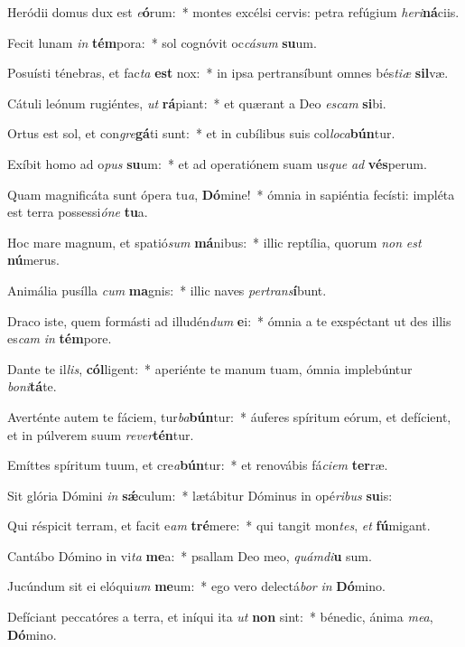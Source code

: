 \item Heródii domus dux est \textit{e}\textbf{ó}rum:~* montes excélsi cervis: petra refúgium \textit{he}\textit{ri}\textbf{ná}ciis.
\item Fecit lunam \textit{in} \textbf{tém}pora:~* sol cognóvit oc\textit{cá}\textit{sum} \textbf{su}um.
\item Posuísti ténebras, et fac\textit{ta} \textbf{est} nox:~* in ipsa pertransíbunt omnes bés\textit{ti}\textit{æ} \textbf{sil}væ.
\item Cátuli leónum rugiéntes, \textit{ut} \textbf{rá}piant:~* et quærant a Deo \textit{es}\textit{cam} \textbf{si}bi.
\item Ortus est sol, et con\textit{gre}\textbf{gá}ti sunt:~* et in cubílibus suis col\textit{lo}\textit{ca}\textbf{bún}tur.
\item Exíbit homo ad o\textit{pus} \textbf{su}um:~* et ad operatiónem suam us\textit{que} \textit{ad} \textbf{vés}perum.
\item Quam magnificáta sunt ópera tu\textit{a}, \textbf{Dó}mine!~* ómnia in sapiéntia fecísti: impléta est terra possessi\textit{ó}\textit{ne} \textbf{tu}a.
\item Hoc mare magnum, et spatió\textit{sum} \textbf{má}nibus:~* illic reptília, quorum \textit{non} \textit{est} \textbf{nú}merus.
\item Animália pusílla \textit{cum} \textbf{ma}gnis:~* illic naves \textit{per}\textit{trans}\textbf{í}bunt.
\item Draco iste, quem formásti ad illudén\textit{dum} \textbf{e}i:~* ómnia a te exspéctant ut des illis es\textit{cam} \textit{in} \textbf{tém}pore.
\item Dante te il\textit{lis}, \textbf{cól}ligent:~* aperiénte te manum tuam, ómnia implebúntur \textit{bo}\textit{ni}\textbf{tá}te.
\item Averténte autem te fáciem, tur\textit{ba}\textbf{bún}tur:~* áuferes spíritum eórum, et defícient, et in púlverem suum \textit{re}\textit{ver}\textbf{tén}tur.
\item Emíttes spíritum tuum, et cre\textit{a}\textbf{bún}tur:~* et renovábis fá\textit{ci}\textit{em} \textbf{ter}ræ.
\item Sit glória Dómini \textit{in} \textbf{sǽ}culum:~* lætábitur Dóminus in opé\textit{ri}\textit{bus} \textbf{su}is:
\item Qui réspicit terram, et facit e\textit{am} \textbf{tré}mere:~* qui tangit mon\textit{tes}, \textit{et} \textbf{fú}migant.
\item Cantábo Dómino in vi\textit{ta} \textbf{me}a:~* psallam Deo meo, \textit{quám}\textit{di}\textbf{u} sum.
\item Jucúndum sit ei elóqui\textit{um} \textbf{me}um:~* ego vero delectá\textit{bor} \textit{in} \textbf{Dó}mino.
\item Defíciant peccatóres a terra, et iníqui ita \textit{ut} \textbf{non} sint:~* bénedic, ánima \textit{me}\textit{a}, \textbf{Dó}mino.

